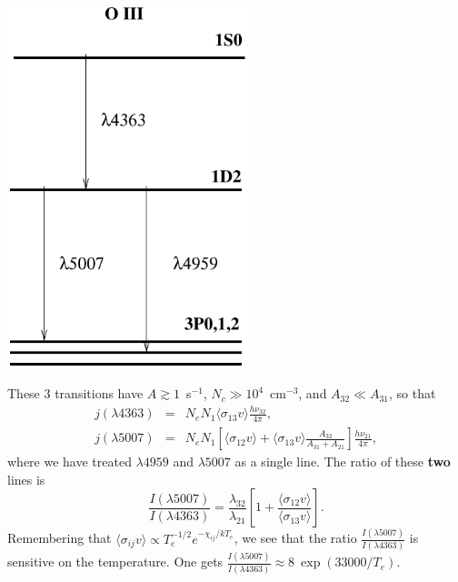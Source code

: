 



\begin{floatingfigure}{8cm}
\includegraphics[width=7cm,height=!]{./C/oiii.pdf}
\end{floatingfigure}  These 3 transitions have $A \gtrsim 1$~s$^{-1}$,  $N_c \gg
10^{4}$~cm$^{-3}$, and $A_{32} \ll A_{31}$, so that 
\begin{eqnarray}
j(\lambda4363) & = &  N_e N_1 \langle \sigma_{13} v \rangle \frac{h \nu_{32}}{4\pi}, \nonumber \\
j(\lambda5007) & = &  N_e N_1 \left[ \langle \sigma_{12} v \rangle  +
\langle \sigma_{13} v \rangle  \frac{A_{32}}{A_{31}+A_{21}} \right] \frac{h \nu_{21}}{4\pi}, \nonumber 
\end{eqnarray}
where we have treated  $\lambda4959$ and $\lambda5007$ as a single
line. The ratio of these  {\bf two} lines is 
\[
\frac{I(\lambda 5007)}{I(\lambda4363)} = \frac{\lambda_{32}}{\lambda_{21}}
\left[1+\frac{\langle \sigma_{12} v \rangle}{\langle \sigma_{13} v
\rangle } \right].
\]
Remembering that  $\langle \sigma_{ij} v \rangle \propto T_e^{-1/2}
e^{-\chi_{ij}/kT_e}$, we see that the ratio $\frac{I(\lambda
5007)}{I(\lambda4363)} $ is sensitive on the temperature. One gets 
$\frac{I(\lambda 5007)}{I(\lambda4363)} \approx 8~\exp(33000/T_e)$.

